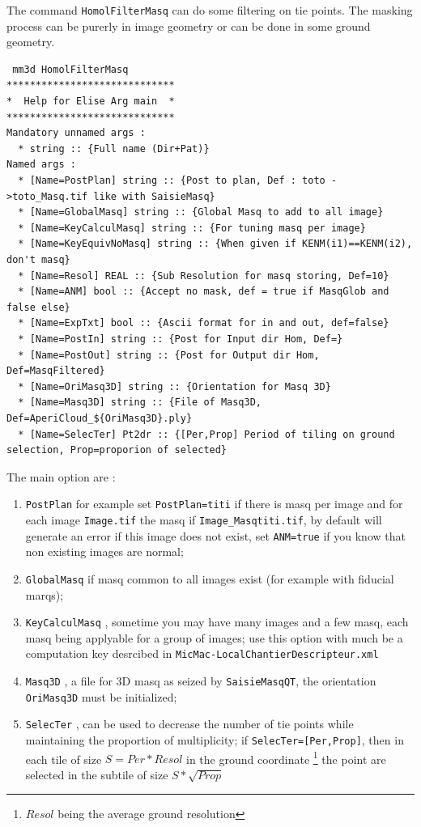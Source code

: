 The command {\tt HomolFilterMasq} can do some filtering on tie points. The masking
process can be purerly in image geometry or can be done in some ground geometry.

\begin{verbatim}
 mm3d HomolFilterMasq
*****************************
*  Help for Elise Arg main  *
*****************************
Mandatory unnamed args : 
  * string :: {Full name (Dir+Pat)}
Named args : 
  * [Name=PostPlan] string :: {Post to plan, Def : toto ->toto_Masq.tif like with SaisieMasq}
  * [Name=GlobalMasq] string :: {Global Masq to add to all image}
  * [Name=KeyCalculMasq] string :: {For tuning masq per image}
  * [Name=KeyEquivNoMasq] string :: {When given if KENM(i1)==KENM(i2), don't masq}
  * [Name=Resol] REAL :: {Sub Resolution for masq storing, Def=10}
  * [Name=ANM] bool :: {Accept no mask, def = true if MasqGlob and false else}
  * [Name=ExpTxt] bool :: {Ascii format for in and out, def=false}
  * [Name=PostIn] string :: {Post for Input dir Hom, Def=}
  * [Name=PostOut] string :: {Post for Output dir Hom, Def=MasqFiltered}
  * [Name=OriMasq3D] string :: {Orientation for Masq 3D}
  * [Name=Masq3D] string :: {File of Masq3D, Def=AperiCloud_${OriMasq3D}.ply}
  * [Name=SelecTer] Pt2dr :: {[Per,Prop] Period of tiling on ground selection, Prop=proporion of selected}
\end{verbatim}

The main option are :

\begin{enumerate}
    \item {\tt PostPlan} for example set {\tt PostPlan=titi} if there is masq per image and for each image 
          {\tt Image.tif} the masq if {\tt Image\_Masqtiti.tif}, by default will generate an error if this
          image does not exist, set {\tt ANM=true} if you know that non existing images are normal;

    \item {\tt GlobalMasq} if masq common to all images exist (for example with fiducial marqs);

    \item {\tt KeyCalculMasq} , sometime you may have many images and a few masq, each masq being applyable
          for a group of images; use this option with much be a computation key desrcibed in
          {\tt MicMac-LocalChantierDescripteur.xml}

    \item {\tt Masq3D} , a file for 3D masq as seized by {\tt SaisieMasqQT}, the orientation {\tt OriMasq3D} 
          must be initialized;

    \item {\tt SelecTer} , can be used to decrease the number of tie points while maintaining the proportion
          of multiplicity;  if {\tt SelecTer=[Per,Prop]}, then in each tile of size $S=Per*Resol$  in the ground coordinate
          \footnote{$Resol$ being the average ground resolution} the point are selected in the subtile of 
          size $S * \sqrt{Prop}$
    
    
\end{enumerate}




